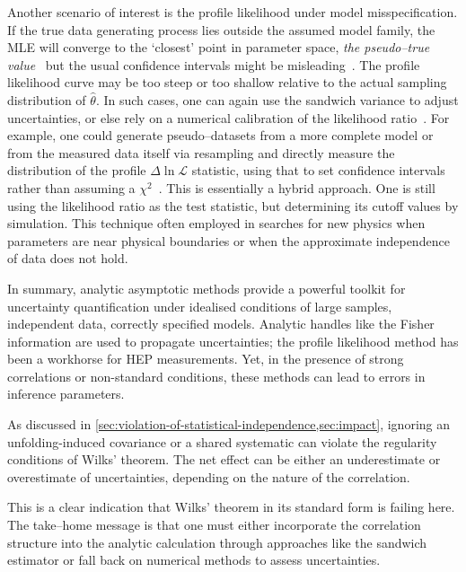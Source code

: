             Another scenario of interest is the profile likelihood under model misspecification.
            If the true data generating process lies outside the assumed model family, the MLE will converge to the `closest' point in parameter space, \emph{the pseudo--true value}~\cite{white_maximum_1982, Guardiani:2025lpm} but the usual confidence intervals might be misleading~\cite{tang_is_2025, bortolato_approximate_2022}. 
            The profile likelihood curve may be too steep or too shallow relative to the actual sampling distribution of $\hat{\theta}$.
            In such cases, one can again use the sandwich variance to adjust uncertainties, or else rely on a numerical calibration of the likelihood ratio~\cite{tian_analyzing_2022}.
            For example, one could generate pseudo--datasets from a more complete model or from the measured data itself via resampling and directly measure the distribution of the profile $\Delta\ln\mathcal{L}$ statistic, using that to set confidence intervals rather than assuming a $\chi^2$~\cite{jiang_finite_2024, Kreutz:2011ujb}.
            This is essentially a hybrid approach.
            One is still using the likelihood ratio as the test statistic, but determining its cutoff values by simulation.
            This technique often employed in searches for new physics when parameters are near physical boundaries or when the approximate independence of data does not hold.

        In summary, analytic asymptotic methods provide a powerful toolkit for uncertainty quantification under idealised conditions of large samples, independent data, correctly specified models.
        Analytic handles like the Fisher information are used to propagate uncertainties;
        the profile likelihood method has been a workhorse for HEP measurements.
        Yet, in the presence of strong correlations or non-standard conditions, these methods can lead to errors in inference parameters.
        
        As discussed in \cref{sec:violation-of-statistical-independence,sec:impact}, ignoring an unfolding-induced covariance or a shared systematic can violate the regularity conditions of Wilks’ theorem.
        The net effect can be either an underestimate or overestimate of uncertainties, depending on the nature of the correlation.

        This is a clear indication that Wilks' theorem in its standard form is failing here.
        The take--home message is that one must either incorporate the correlation structure into the analytic calculation through approaches like the sandwich estimator or fall back on numerical methods to assess uncertainties.

